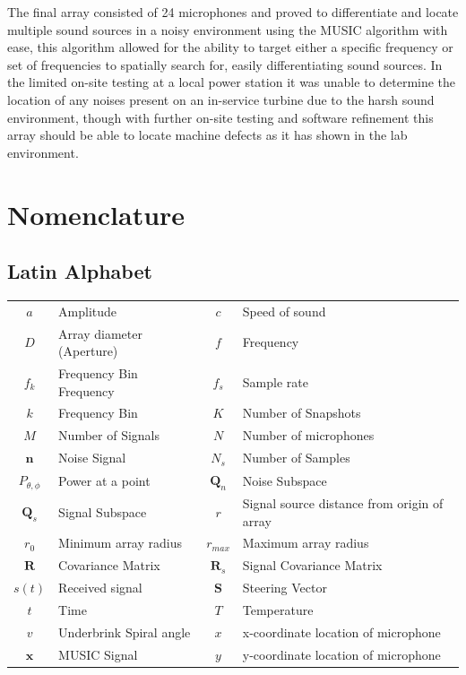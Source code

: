 \documentclass{UoNMCHA}
\numberwithin{equation}{section}
\begin{document}
    The final array consisted of 24 microphones and proved to differentiate and locate multiple sound sources in a noisy environment using the MUSIC algorithm with ease, this algorithm allowed for the ability to target either a specific frequency or set of frequencies to spatially search for, easily differentiating sound sources. In the limited on-site testing at a local power station it was unable to determine the location of any noises present on an in-service turbine due to the harsh sound environment, though with further on-site testing and software refinement this array should be able to locate machine defects as it has shown in the lab environment.

\singlespacing
\newpage
\tableofcontents
\newpage
\listoftables
\listoffigures
\newpage
\section*{Nomenclature}
\subsection*{Latin Alphabet}
    \begin{table}[H]
        \begin{tabular}{clcl}
            $a$&Amplitude&$c$&Speed of sound\\
            $D$&Array diameter (Aperture)&$f$&Frequency\\
            $f_k$&Frequency Bin Frequency&$f_s$&Sample rate\\
            $k$&Frequency Bin&$K$&Number of Snapshots\\
            $M$&Number of Signals&$N$&Number of microphones\\
            $\mathbf{n}$&Noise Signal&$N_s$&Number of Samples\\
            $P_{\theta,\phi}$&Power at a point&$\mathbf{Q}_n$&Noise Subspace\\
            $\mathbf{Q}_s$&Signal Subspace&$r$&Signal source distance from origin of array\\
            $r_0$&Minimum array radius&$r_{max}$&Maximum array radius\\
            $\mathbf{R}$&Covariance Matrix&$\mathbf{R}_s$&Signal Covariance Matrix\\
            $s(t)$&Received signal&$\mathbf{S}$&Steering Vector\\
            $t$&Time&$T$&Temperature\\
            $v$&Underbrink Spiral angle&$x$&x-coordinate location of microphone\\
            $\mathbf{x}$&MUSIC Signal&$y$&y-coordinate location of microphone
        \end{tabular}
    \end{table}
\end{document}
